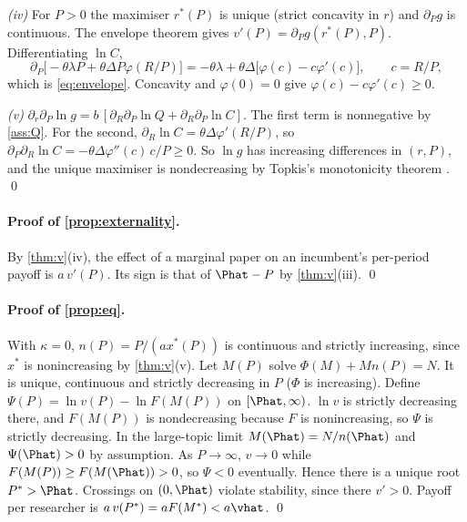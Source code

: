 \emph{(iv)} For $P>0$ the maximiser $r^*(P)$ is unique (strict concavity in $r$) and $\partial_P g$ is continuous. The envelope theorem \citep{milgromsegal2002} gives $v'(P)=\partial_Pg(r^*(P),P)$. Differentiating $\ln C$,
\[
\partial_P\big[-\theta\lambda P+\theta\Delta P\varphi(R/P)\big]=-\theta\lambda+\theta\Delta\big[\varphi(c)-c\varphi'(c)\big],\qquad c=R/P,
\]
which is \eqref{eq:envelope}. Concavity and $\varphi(0)=0$ give $\varphi(c)-c\varphi'(c)\ge0$.

\emph{(v)} $\partial_r\partial_P\ln g=b\,[\partial_R\partial_P\ln Q+\partial_R\partial_P\ln C]$. The first term is nonnegative by \cref{ass:Q}. For the second,
$\partial_R\ln C=\theta\Delta\varphi'(R/P)$, so $\partial_P\partial_R\ln C=-\theta\Delta\varphi''(c)\,c/P\ge0$. So $\ln g$ has increasing differences in $(r,P)$, and the unique maximiser is nondecreasing by Topkis's monotonicity theorem \citep{topkis1998}. \qed

\paragraph{Proof of \cref{prop:externality}.} By \cref{thm:v}(iv), the effect
of a marginal paper on an incumbent's per-period payoff is $a\,v'(P)$. Its sign is
that of $\Phat-P$ by \cref{thm:v}(iii). \qed

\paragraph{Proof of \cref{prop:eq}.} With $\kappa=0$, $n(P)=P/(a x^*(P))$ is
continuous and strictly increasing, since $x^*$ is nonincreasing by
\cref{thm:v}(v). Let $M(P)$ solve $\Phi(M)+Mn(P)=N$. It is unique,
continuous and strictly decreasing in $P$ ($\Phi$ is increasing). Define
$\Psi(P)=\ln v(P)-\ln F(M(P))$ on $[\Phat,\infty)$. $\ln v$ is strictly
decreasing there, and $F(M(P))$ is nondecreasing because $F$ is nonincreasing,
so $\Psi$ is strictly decreasing. In the large-topic limit $M(\Phat)=N/n(\Phat)$
and $\Psi(\Phat)>0$ by assumption. As $P\to\infty$, $v\to0$ while
$F(M(P))\ge F(M(\Phat))>0$, so $\Psi<0$ eventually. Hence there is a unique root
$P^*>\Phat$. Crossings on $(0,\Phat)$ violate stability, since there $v'>0$.
Payoff per researcher is $a\,v(P^*)=aF(M^*)<a\vhat$. \qed

